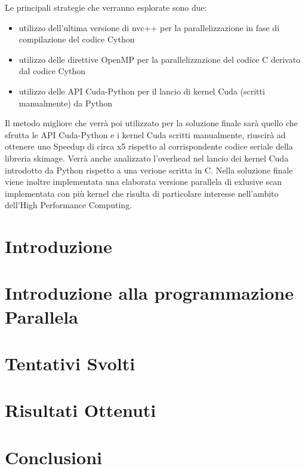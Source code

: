 \documentclass[12pt,a4paper]{report}
\begin{document}
Le principali strategie che verranno esplorate sono due:
\begin{itemize}
\item utilizzo dell'ultima versione di nvc++ per la parallelizzazione in fase di compilazione del codice Cython
\item utilizzo delle direttive OpenMP per la parallelizzazione del codice C derivato dal codice Cython
\item utilizzo delle API Cuda-Python per il lancio di kernel Cuda (scritti manualmente) da Python 
\end{itemize}
Il metodo migliore che verrà poi utilizzato per la soluzione finale sarà quello che sfrutta le API Cuda-Python e i kernel Cuda scritti manualmente, riuscirà ad ottenere uno Speedup di circa x5 rispetto al corrispondente codice seriale della libreria skimage. Verrà anche analizzato l'overhead nel lancio dei kernel Cuda introdotto da Python rispetto a una verione scritta in C. \newline
Nella soluzione finale viene inoltre implementata una elaborata versione parallela di exlusive scan implementata con più kernel che risulta di particolare interesse nell'ambito dell'High Performance Computing.



\chapter{Introduzione}

\chapter{Introduzione alla programmazione Parallela}

\chapter{Tentativi Svolti}


\chapter{Risultati Ottenuti}

\chapter{Conclusioni}
\end{document}
